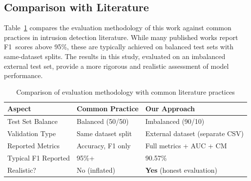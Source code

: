 \subsection{Comparison with Literature}

Table~\ref{tab:literature_comparison} compares the evaluation methodology of this work against common practices in intrusion detection literature. While many published works report F1~scores above 95\%, these are typically achieved on balanced test sets with same-dataset splits. The results in this study, evaluated on an imbalanced external test set, provide a more rigorous and realistic assessment of model performance.

\begin{table}[htbp]
    \centering
    \caption{Comparison of evaluation methodology with common literature practices}
    \label{tab:literature_comparison}
    \begin{tabular}{lll}
        \toprule
        \textbf{Aspect} & \textbf{Common Practice} & \textbf{Our Approach} \\
        \midrule
        Test Set Balance     & Balanced (50/50)             & Imbalanced (90/10) \\
        Validation Type      & Same dataset split           & External dataset (separate CSV) \\
        Reported Metrics     & Accuracy, F1 only            & Full metrics + AUC + CM \\
        Typical F1 Reported  & 95\%+                        & 90.57\% \\
        Realistic?           & No (inflated)                & \textbf{Yes} (honest evaluation) \\
        \bottomrule
    \end{tabular}
\end{table}

